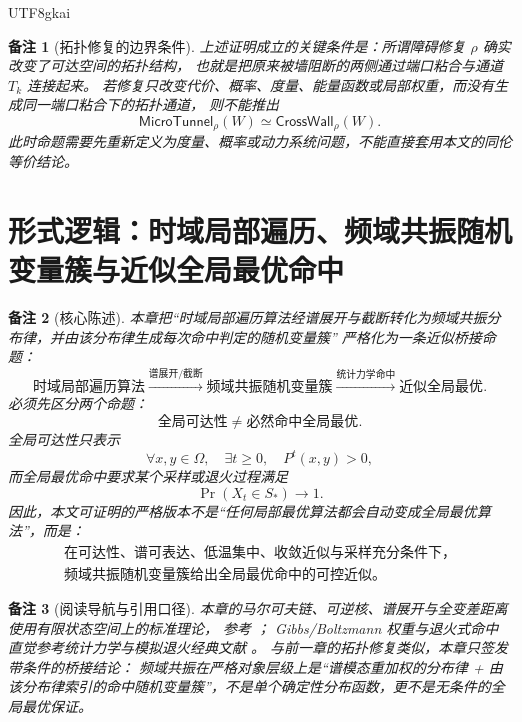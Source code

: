 \documentclass[12pt]{article}
\newtheorem{remark}{备注}[section]
\newcommand{\MicroTunnel}{\mathsf{MicroTunnel}}
\newcommand{\CrossWall}{\mathsf{CrossWall}}
\begin{document}
\begin{CJK*}{UTF8}{gkai}
\begin{remark}[拓扑修复的边界条件]
上述证明成立的关键条件是：所谓障碍修复 \(\rho\) 确实改变了可达空间的拓扑结构，
也就是把原来被墙阻断的两侧通过端口粘合与通道 \(T_k\) 连接起来。
若修复只改变代价、概率、度量、能量函数或局部权重，而没有生成同一端口粘合下的拓扑通道，
则不能推出
\[
  \MicroTunnel_{\rho}(W)\simeq\CrossWall_{\rho}(W).
\]
此时命题需要先重新定义为度量、概率或动力系统问题，不能直接套用本文的同伦等价结论。
\end{remark}

\clearpage

\section{形式逻辑：时域局部遍历、频域共振随机变量簇与近似全局最优命中}
\label{sec:tex55-time-frequency-global-hit}

\begin{remark}[核心陈述]
本章把“时域局部遍历算法经谱展开与截断转化为频域共振分布律，并由该分布律生成每次命中判定的随机变量簇”
严格化为一条近似桥接命题：
\[
  \boxed{
  \text{时域局部遍历算法}
  \xrightarrow{\text{谱展开/截断}}
  \text{频域共振随机变量簇}
  \xrightarrow{\text{统计力学命中}}
  \text{近似全局最优}
  }.
\]
必须先区分两个命题：
\[
  \text{全局可达性}\neq \text{必然命中全局最优}.
\]
全局可达性只表示
\[
  \forall x,y\in\Omega,\quad \exists t\ge0,\quad P^t(x,y)>0,
\]
而全局最优命中要求某个采样或退火过程满足
\[
  \Pr(X_t\in S_*)\to 1.
\]
因此，本文可证明的严格版本不是“任何局部最优算法都会自动变成全局最优算法”，而是：
\[
  \boxed{
  \begin{gathered}
  \text{在可达性、谱可表达、低温集中、收敛近似与采样充分条件下，}\\
  \text{频域共振随机变量簇给出全局最优命中的可控近似。}
  \end{gathered}
  }
\]
\end{remark}

\begin{remark}[阅读导航与引用口径]
本章的马尔可夫链、可逆核、谱展开与全变差距离使用有限状态空间上的标准理论，
参考 \cite{LevinPeresWilmer2017Markov,Norris1998MarkovChains}；
Gibbs/Boltzmann 权重与退火式命中直觉参考统计力学与模拟退火经典文献
\cite{Kirkpatrick1983Optimization,Hajek1988Cooling}。
与前一章的拓扑修复类似，本章只签发带条件的桥接结论：
频域共振在严格对象层级上是“谱模态重加权的分布律 + 由该分布律索引的命中随机变量簇”，不是单个确定性分布函数，更不是无条件的全局最优保证。
\end{remark}


\end{CJK*}
\end{document}
